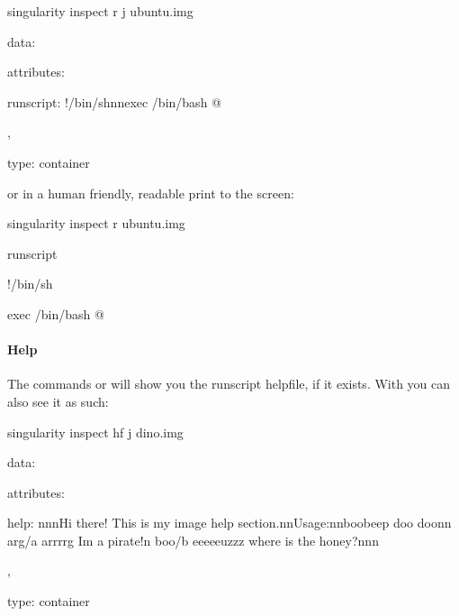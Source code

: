 \documentclass[letterpaper,10pt,english]{sphinxmanual}
\begin{document}
%
\begin{sphinxVerbatim}[commandchars=\\\{\}]
\PYGZdl{} singularity inspect \PYGZhy{}r \PYGZhy{}j ubuntu.img\PYGZob{}

    \PYGZdq{}data\PYGZdq{}: \PYGZob{}

        \PYGZdq{}attributes\PYGZdq{}: \PYGZob{}

            \PYGZdq{}runscript\PYGZdq{}: \PYGZdq{}\PYGZsh{}!/bin/sh\PYGZbs{}n\PYGZbs{}nexec /bin/bash \PYGZbs{}\PYGZdq{}\PYGZdl{}@\PYGZbs{}\PYGZdq{}\PYGZdq{}

        \PYGZcb{},

        \PYGZdq{}type\PYGZdq{}: \PYGZdq{}container\PYGZdq{}

    \PYGZcb{}

\PYGZcb{}
\end{sphinxVerbatim}

or in a human friendly, readable print to the screen:

%
\begin{sphinxVerbatim}[commandchars=\\\{\}]
\PYGZdl{} singularity inspect \PYGZhy{}r ubuntu.img


\PYGZsh{}\PYGZsh{}runscript

\PYGZsh{}!/bin/sh


exec /bin/bash \PYGZdq{}\PYGZdl{}@\PYGZdq{}
\end{sphinxVerbatim}


\paragraph{Help}
\label{\detokenize{appendix:help}}
The commands  or  will show you the runscript helpfile, if it exists.
With  you can also see it as such:

%
\begin{sphinxVerbatim}[commandchars=\\\{\}]
singularity inspect \PYGZhy{}hf \PYGZhy{}j dino.img

\PYGZob{}

    \PYGZdq{}data\PYGZdq{}: \PYGZob{}

        \PYGZdq{}attributes\PYGZdq{}: \PYGZob{}

            \PYGZdq{}help\PYGZdq{}: \PYGZdq{}\PYGZbs{}n\PYGZbs{}n\PYGZbs{}nHi there! This is my image help section.\PYGZbs{}n\PYGZbs{}nUsage:\PYGZbs{}n\PYGZbs{}nboobeep doo doo\PYGZbs{}n\PYGZbs{}n \PYGZhy{}\PYGZhy{}arg/a arrrrg I\PYGZsq{}m a pirate!\PYGZbs{}n \PYGZhy{}\PYGZhy{}boo/b eeeeeuzzz where is the honey?\PYGZbs{}n\PYGZbs{}n\PYGZbs{}n\PYGZdq{}

        \PYGZcb{},

        \PYGZdq{}type\PYGZdq{}: \PYGZdq{}container\PYGZdq{}

    \PYGZcb{}

\PYGZcb{}
\end{sphinxVerbatim}
\end{document}
